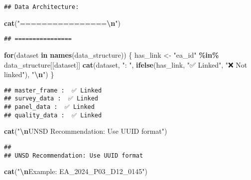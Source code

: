\documentclass[
]{article}
\newenvironment{Shaded}{\begin{snugshade}}{\end{snugshade}}
\newcommand{\ControlFlowTok}[1]{\textcolor[rgb]{0.13,0.29,0.53}{\textbf{#1}}}
\newcommand{\FunctionTok}[1]{\textcolor[rgb]{0.13,0.29,0.53}{\textbf{#1}}}
\newcommand{\NormalTok}[1]{#1}
\newcommand{\OtherTok}[1]{\textcolor[rgb]{0.56,0.35,0.01}{#1}}
\newcommand{\SpecialCharTok}[1]{\textcolor[rgb]{0.81,0.36,0.00}{\textbf{#1}}}
\newcommand{\StringTok}[1]{\textcolor[rgb]{0.31,0.60,0.02}{#1}}
\begin{document}
\begin{verbatim}
## Data Architecture:
\end{verbatim}

\begin{Shaded}
\begin{Highlighting}[]
\FunctionTok{cat}\NormalTok{(}\StringTok{"================}\SpecialCharTok{\textbackslash{}n}\StringTok{"}\NormalTok{)}
\end{Highlighting}
\end{Shaded}

\begin{verbatim}
## ================
\end{verbatim}

\begin{Shaded}
\begin{Highlighting}[]
\ControlFlowTok{for}\NormalTok{(dataset }\ControlFlowTok{in} \FunctionTok{names}\NormalTok{(data\_structure)) \{}
\NormalTok{  has\_link }\OtherTok{\textless{}{-}} \StringTok{"ea\_id"} \SpecialCharTok{\%in\%}\NormalTok{ data\_structure[[dataset]]}
  \FunctionTok{cat}\NormalTok{(dataset, }\StringTok{": "}\NormalTok{, }
      \FunctionTok{ifelse}\NormalTok{(has\_link, }\StringTok{"✅ Linked"}\NormalTok{, }\StringTok{"❌ Not linked"}\NormalTok{), }\StringTok{"}\SpecialCharTok{\textbackslash{}n}\StringTok{"}\NormalTok{)}
\NormalTok{\}}
\end{Highlighting}
\end{Shaded}

\begin{verbatim}
## master_frame :  ✅ Linked 
## survey_data :  ✅ Linked 
## panel_data :  ✅ Linked 
## quality_data :  ✅ Linked
\end{verbatim}

\begin{Shaded}
\begin{Highlighting}[]
\FunctionTok{cat}\NormalTok{(}\StringTok{"}\SpecialCharTok{\textbackslash{}n}\StringTok{UNSD Recommendation: Use UUID format"}\NormalTok{)}
\end{Highlighting}
\end{Shaded}

\begin{verbatim}
## 
## UNSD Recommendation: Use UUID format
\end{verbatim}

\begin{Shaded}
\begin{Highlighting}[]
\FunctionTok{cat}\NormalTok{(}\StringTok{"}\SpecialCharTok{\textbackslash{}n}\StringTok{Example: \textquotesingle{}EA\_2024\_P03\_D12\_0145\textquotesingle{}"}\NormalTok{)}
\end{Highlighting}
\end{Shaded}
\end{document}
